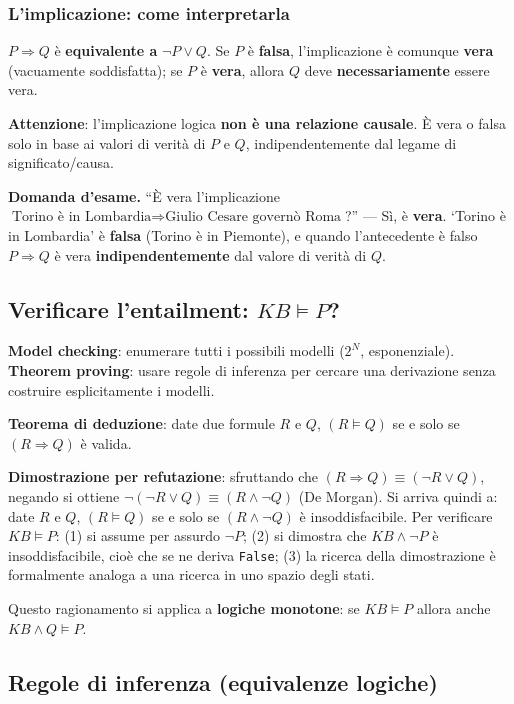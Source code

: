 \documentclass[11pt,a4paper]{report}
\newcommand{\domandaesame}[1]{\begin{esame}\textbf{Domanda d'esame.} #1\end{esame}}
\begin{document}
\subsubsection*{L'implicazione: come interpretarla}

$P\Rightarrow Q$ è \textbf{equivalente a} $\neg P \vee Q$. Se $P$ è \textbf{falsa}, l'implicazione è comunque \textbf{vera} (vacuamente soddisfatta); se $P$ è \textbf{vera}, allora $Q$ deve \textbf{necessariamente} essere vera.

\textbf{Attenzione}: l'implicazione logica \textbf{non è una relazione causale}. È vera o falsa solo in base ai valori di verità di $P$ e $Q$, indipendentemente dal legame di significato/causa.

\domandaesame{``È vera l'implicazione $\text{Torino è in Lombardia} \Rightarrow \text{Giulio Cesare governò Roma}$?'' --- Sì, è \textbf{vera}. `Torino è in Lombardia' è \textbf{falsa} (Torino è in Piemonte), e quando l'antecedente è falso $P\Rightarrow Q$ è vera \textbf{indipendentemente} dal valore di verità di $Q$.}

\subsection*{Verificare l'entailment: $KB \models P$?}

\textbf{Model checking}: enumerare tutti i possibili modelli ($2^N$, esponenziale). \textbf{Theorem proving}: usare regole di inferenza per cercare una derivazione senza costruire esplicitamente i modelli.

\textbf{Teorema di deduzione}: date due formule $R$ e $Q$, $(R \models Q)$ se e solo se $(R \Rightarrow Q)$ è valida.

\textbf{Dimostrazione per refutazione}: sfruttando che $(R\Rightarrow Q) \equiv (\neg R \vee Q)$, negando si ottiene $\neg(\neg R\vee Q) \equiv (R\wedge\neg Q)$ (De Morgan). Si arriva quindi a: date $R$ e $Q$, $(R\models Q)$ se e solo se $(R\wedge\neg Q)$ è insoddisfacibile. Per verificare $KB\models P$: (1) si assume per assurdo $\neg P$; (2) si dimostra che $KB\wedge\neg P$ è insoddisfacibile, cioè che se ne deriva \texttt{False}; (3) la ricerca della dimostrazione è formalmente analoga a una ricerca in uno spazio degli stati.

Questo ragionamento si applica a \textbf{logiche monotone}: se $KB \models P$ allora anche $KB\wedge Q \models P$.

\subsection*{Regole di inferenza (equivalenze logiche)}
\end{document}
